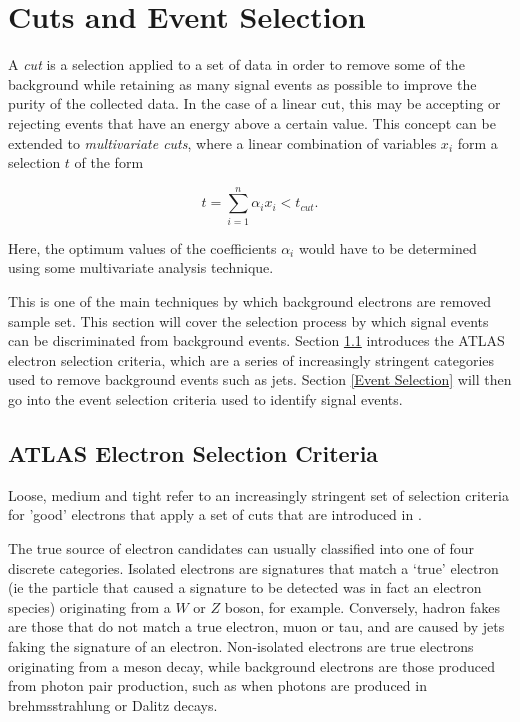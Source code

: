 \documentclass{article}
\begin{document}
\section{Cuts and Event Selection}
\label{sec:cuts}
A \textit{cut} is a selection applied to a set of data in order to remove some of the background while retaining as many signal events as possible to improve the purity of the collected data. In the case of a linear cut, this may be accepting or rejecting events that have an energy above a certain value. This concept can be extended to \textit{multivariate cuts}, where a linear combination of variables $x_i$ form a selection $t$ of the form

\begin{equation}
t = \sum_{i=1}^{n}\alpha_i x_i < t_{cut}.
\end{equation}

Here, the optimum values of the coefficients $\alpha_i$ would have to be determined using some multivariate analysis technique.

This is one of the main techniques by which background electrons are removed sample set. This section will cover the selection process by which signal events can be discriminated from background events. Section \ref{sec:cuts_selection} introduces the ATLAS electron selection criteria, which are a series of increasingly stringent categories used to remove background events such as jets. 
Section \ref{Event Selection} will then go into the event selection criteria used to identify signal events.

\subsection{ATLAS Electron Selection Criteria}
\label{sec:cuts_selection}
Loose, medium and tight refer to an increasingly stringent set of selection criteria for 'good' electrons that apply a set of cuts that are introduced in \cite{expectedElectronPerformance}.

The true source of electron candidates can usually classified into one of four discrete categories. 
Isolated electrons are signatures that match a `true' electron (ie the particle that caused a signature to be detected was in fact an electron species) originating from a $W$ or $Z$ boson, for example. Conversely, hadron fakes are those that do not match a true electron, muon or tau, and are caused by jets faking the signature of an electron.
Non-isolated electrons are true electrons originating from a meson decay, while background electrons are those produced from photon pair production, such as when photons are produced in brehmsstrahlung or Dalitz decays.
\end{document}
